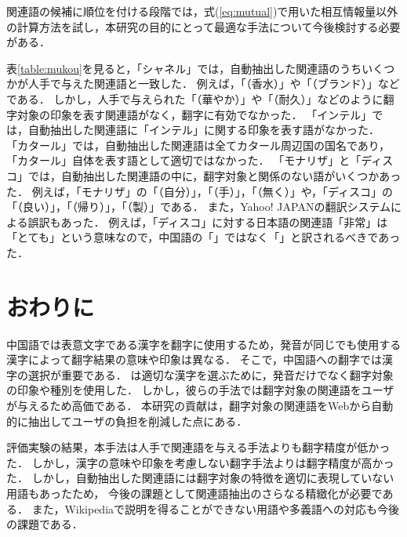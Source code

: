\documentclass[japanese]{jnlp_1.4}
\begin{document}
{関連語の候補に順位を付ける段階では，式(\ref{eq:mutual})で用いた相互情報量以外の計算方法を試し，本研究の目的にとって最適な手法について今後検討する必要がある．

表\ref{table:mukou}を見ると，「シャネル」では，自動抽出した関連語のうちいくつかが人手で与えた関連語と一致した．
例えば，「（香水）」や「（ブランド）」などである．
しかし，人手で与えられた「（華やか）」や「（耐久）」などのように翻字対象の印象を表す関連語がなく，翻字に有効でなかった．
「インテル」では，自動抽出した関連語に「インテル」に関する印象を表す語がなかった．
「カタール」では，自動抽出した関連語は全てカタール周辺国の国名であり，「カタール」自体を表す語として適切ではなかった．
「モナリザ」と「ディスコ」では，自動抽出した関連語の中に，翻字対象と関係のない語がいくつかあった．
例えば，「モナリザ」の「（自分）」，「（手）」，「（無く）」や，「ディスコ」の「（良い）」，「（帰り）」，「（製）」である．
また，Yahoo! JAPANの翻訳システムによる誤訳もあった．
例えば，「ディスコ」に対する日本語の関連語「非常」は「とても」という意味なので，中国語の「」ではなく「」と訳されるべきであった．


\section{おわりに}

中国語では表意文字である漢字を翻字に使用するため，発音が同じでも使用する漢字によって翻字結果の意味や印象は異なる．
そこで，中国語への翻字では漢字の選択が重要である．
\cite{Article_21}は適切な漢字を選ぶために，発音だけでなく翻字対象の印象や種別を使用した．
しかし，彼らの手法では翻字対象の関連語をユーザが与えるため高価である．
本研究の貢献は，翻字対象の関連語をWebから自動的に抽出してユーザの負担を削減した点にある．

評価実験の結果，本手法は人手で関連語を与える手法よりも翻字精度が低かった．
しかし，漢字の意味や印象を考慮しない翻字手法よりは翻字精度が高かった．
しかし，自動抽出した関連語には翻字対象の特徴を適切に表現していない用語もあったため，
今後の課題として関連語抽出のさらなる精緻化が必要である．
また，Wikipediaで説明を得ることができない用語や多義語への対応も今後の課題である．




\begin{thebibliography}{}


\end{thebibliography}}
\end{document}
